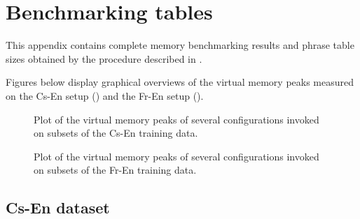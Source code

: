 \chapter{Benchmarking tables}
\label{chap:benchmarking-tables}

This appendix contains complete memory benchmarking results and
phrase table sizes obtained by the procedure described in .

Figures below display graphical overviews of the virtual memory peaks measured on the Cs-En setup
() and the Fr-En setup ().

\begin{figure}[!htb]
  \centering
  
  \caption{
    Plot of the virtual memory peaks of several \eppex{} configurations invoked on subsets of the Cs-En training data.
  }
  \label{fig:cs-en-vm-peaks-summary}
\end{figure}

\begin{figure}[!htb]
  \centering
  
  \caption{
    Plot of the virtual memory peaks of several \eppex{} configurations invoked on subsets of the Fr-En training data.
  }
  \label{fig:fr-en-vm-peaks-summary}
\end{figure}

\openright
\section{Cs-En dataset}

